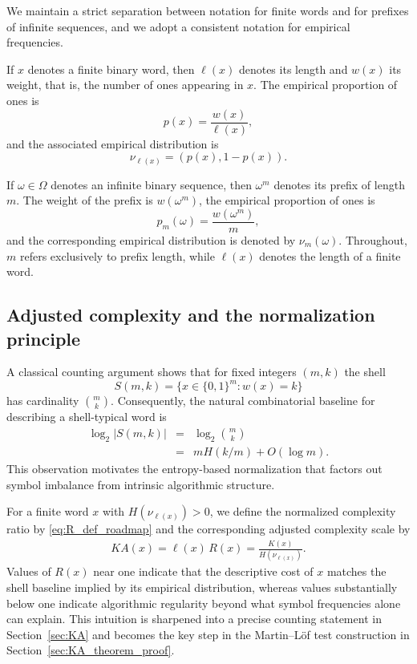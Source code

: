 \documentclass[12pt]{article}
\newcommand{\be}{\begin{eqnarray}}
\newcommand{\ee}{\end{eqnarray}}
\begin{document}
We maintain a strict separation between notation for finite words and for
prefixes of infinite sequences, and we adopt a consistent notation for empirical
frequencies.

If $x$ denotes a finite binary word, then $\ell(x)$ denotes its length and
$w(x)$ its weight, that is, the number of ones appearing in $x$. The empirical
proportion of ones is
$$
p(x)=\frac{w(x)}{\ell(x)},
$$
and the associated empirical distribution is
$$
\nu_{\ell(x)}=(p(x),1-p(x)).
$$

If $\omega\in\Omega$ denotes an infinite binary sequence, then $\omega^m$
denotes its prefix of length $m$. The weight of the prefix is $w(\omega^m)$,
the empirical proportion of ones is
$$
p_m(\omega)=\frac{w(\omega^m)}{m},
$$
and the corresponding empirical distribution is denoted by $\nu_m(\omega)$.
Throughout, $m$ refers exclusively to prefix length, while $\ell(x)$ denotes
the length of a finite word.

\subsection*{Adjusted complexity and the normalization principle}

A classical counting argument shows that for fixed integers $(m,k)$ the shell
\[
S(m,k)=\{x\in\{0,1\}^m:w(x)=k\}
\]
has cardinality $\binom{m}{k}$. Consequently, the natural combinatorial baseline
for describing a shell-typical word is
\begin{eqnarray}
\log_2|S(m,k)|
&=&
\log_2\binom{m}{k}
\nonumber\\
&=&
mH(k/m)+O(\log m).
\label{eq:shell_size_roadmap}
\end{eqnarray}
This observation motivates the entropy-based normalization that factors out
symbol imbalance from intrinsic algorithmic structure.

For a finite word $x$ with $H(\nu_{\ell(x)})>0$, we define the normalized
complexity ratio by \eqref{eq:R_def_roadmap} and the corresponding adjusted
complexity scale by
\be
KA(x)=\ell(x)\,R(x)=\frac{K(x)}{H(\nu_{\ell(x)})}.
\label{eq:KA_def_roadmap}
\ee
Values of $R(x)$ near one indicate that the descriptive cost of $x$ matches the
shell baseline implied by its empirical distribution, whereas values
substantially below one indicate algorithmic regularity beyond what symbol
frequencies alone can explain. This intuition is sharpened into a precise
counting statement in Section~\ref{sec:KA} and becomes the key step in the
Martin--L\"of test construction in
Section~\ref{sec:KA_theorem_proof}.
\end{document}
